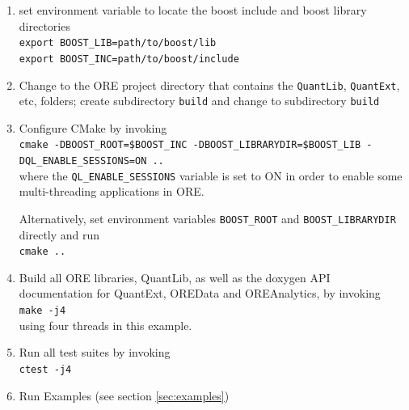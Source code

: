 \documentclass[12pt, a4paper]{article}
\begin{document}
\begin{enumerate}
\item set environment variable to locate the boost include and boost library directories\\
\medskip
  {\tt export BOOST\_LIB=path/to/boost/lib}\\
  {\tt export BOOST\_INC=path/to/boost/include}
\medskip
\item Change to the ORE project directory that contains the {\tt QuantLib}, {\tt QuantExt}, etc, folders; create subdirectory {\tt build} and change to subdirectory {\tt build}
\item Configure CMake by invoking \\
\medskip
{\tt cmake -DBOOST\_ROOT=\${BOOST\_INC} -DBOOST\_LIBRARYDIR=\${BOOST\_LIB} -DQL\_ENABLE\_SESSIONS=ON ..} \\
\medskip
where the {\tt QL\_ENABLE\_SESSIONS} variable is set to ON in order to enable some multi-threading applications in ORE.

Alternatively, set environment variables {\tt BOOST\_ROOT} and {\tt BOOST\_LIBRARYDIR} directly and run \\
\medskip
{\tt cmake ..} \\
\medskip
\item Build all ORE libraries, QuantLib, as well as the doxygen API documentation for QuantExt, OREData and OREAnalytics, by invoking \\
\medskip
{\tt make -j4} \\
\medskip
using four threads in this example.
\medskip
\item Run all test suites by invoking \\
\medskip
{\tt ctest -j4}
\item Run Examples (see section \ref{sec:examples})
\end{enumerate}
\end{document}
